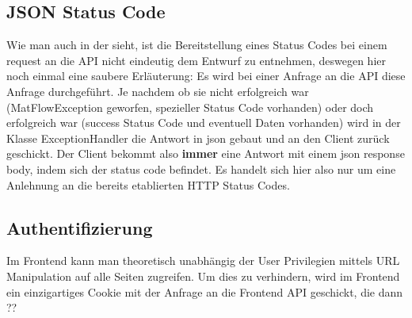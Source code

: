 \subsection{JSON Status Code}
Wie man auch in der  sieht, ist die Bereitstellung eines Status Codes bei einem request an die API nicht eindeutig
dem Entwurf zu entnehmen, deswegen hier noch einmal eine saubere Erläuterung:
Es wird bei einer Anfrage an die API diese Anfrage durchgeführt. Je nachdem ob sie nicht erfolgreich war (MatFlowException 
geworfen, spezieller Status Code vorhanden) oder doch erfolgreich war (success Status Code und eventuell Daten vorhanden) 
wird in der Klasse ExceptionHandler die Antwort in json gebaut und an den Client zurück geschickt. 
Der Client bekommt also \textbf{immer} eine Antwort mit einem json response body, indem sich der status code befindet. 
Es handelt sich hier also nur um eine Anlehnung an die bereits etablierten HTTP Status Codes.

\subsection{Authentifizierung} \label{Cookie}
Im Frontend kann man theoretisch unabhängig der User Privilegien mittels URL Manipulation auf alle 
Seiten zugreifen. Um dies zu verhindern, wird im Frontend ein einzigartiges Cookie mit der Anfrage an die Frontend
API geschickt, die dann ??







